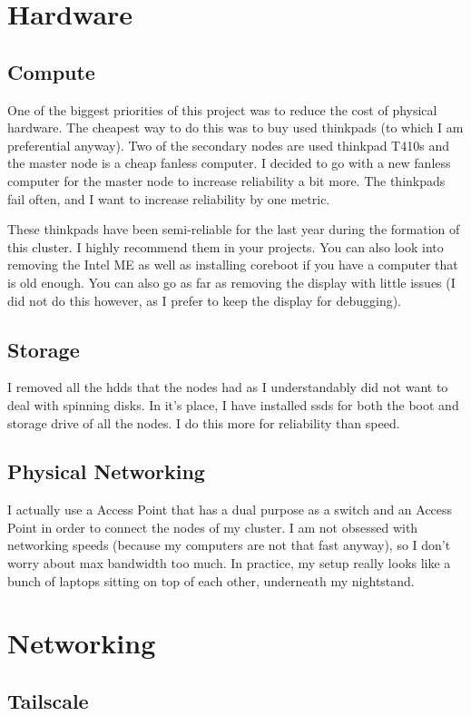 \documentclass[12pt]{article}
\begin{document}
\section{Hardware}
\subsection{Compute}
One of the biggest priorities of this project was to reduce the cost of physical hardware. The cheapest way to do this was to buy used thinkpads (to which I am preferential anyway). Two of the secondary nodes are used thinkpad T410s and the master node is a cheap fanless computer. I decided to go with a new fanless computer for the master node to increase reliability a bit more. The thinkpads fail often, and I want to increase reliability by one metric.

These thinkpads have been semi-reliable for the last year during the formation of this cluster. I highly recommend them in your projects. You can also look into removing the Intel ME as well as installing coreboot if you have a computer that is old enough. You can also go as far as removing the display with little issues (I did not do this however, as I prefer to keep the display for debugging).

\subsection{Storage}
I removed all the hdds that the nodes had as I understandably did not want to deal with spinning disks. In it's place, I have installed ssds for both the boot and storage drive of all the nodes. I do this more for reliability than speed.

\subsection{Physical Networking}
I actually use a Access Point that has a dual purpose as a switch and an Access Point in order to connect the nodes of my cluster. I am not obsessed with networking speeds (because my computers are not that fast anyway), so I don't worry about max bandwidth too much. In practice, my setup really looks like a bunch of laptops sitting on top of each other, underneath my nightstand.

\section{Networking}
\subsection{Tailscale}
\end{document}
